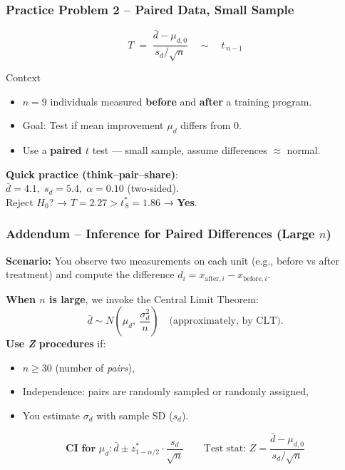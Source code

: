 \documentclass[handout]{beamer}
\begin{document}
\begin{frame}
\frametitle{Practice Problem 2 -- Paired Data, Small Sample}

\[
T \;=\;\frac{\bar d - \mu_{d,0}}{s_d/\sqrt n}\quad\sim\quad t_{\,n-1}
\]

\vspace{-0.5em}

\begin{block}{Context}
\begin{itemize}\setlength\itemsep{0.4em}
  \item \(n=9\) individuals measured \textbf{before} and \textbf{after} a training program.
  \item Goal: Test if mean improvement \(\mu_d\) differs from 0.
  \item Use a \textbf{paired \(t\)} test — small sample, assume differences $\approx$ normal.
\end{itemize}
\end{block}

\pause

\textbf{Quick practice (think–pair–share)}:\\
\(\bar d=4.1,\; s_d=5.4,\; \alpha=0.10\) (two-sided).\\
Reject \(H_0\)? → \(T = 2.27 > t^{\ast}_{\,8} = 1.86\) → \textbf{Yes}.

\end{frame}

\begin{frame}
\frametitle{Addendum -- Inference for Paired Differences (Large $n$)}
\small 

\textbf{Scenario:} You observe two measurements on each unit (e.g., before vs after treatment)  
and compute the difference $d_i = x_{\text{after},i} - x_{\text{before},i}$.

\vspace{0.6em}
\textbf{When $n$ is large}, we invoke the Central Limit Theorem:
\[
\bar{d} \sim N\left(\mu_d,\ \frac{\sigma_d^2}{n}\right)
\quad\text{(approximately, by CLT)}.
\]
\textbf{Use \textit{Z} procedures} if:
\begin{itemize}
  \item $n \ge 30$ (number of \textit{pairs}),
  \item Independence: pairs are randomly sampled or randomly assigned,
  \item You estimate $\sigma_d$ with sample SD ($s_d$).
\end{itemize}


\[
\textbf{CI for $\mu_d$}: \bar{d} \pm z^{\ast}_{1-\alpha/2} \cdot \frac{s_d}{\sqrt{n}}
\qquad \text{Test stat: } Z = \frac{\bar{d} - \mu_{d,0}}{s_d/\sqrt{n}}
\]

\end{frame}
\end{document}
